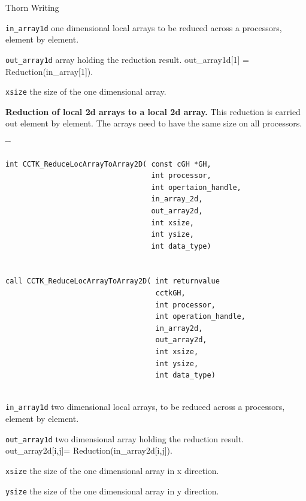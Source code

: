 \begin{cactuspart}{Thorn Writing}
\begin{Lentry}
\item[\texttt{in\_array1d}] one dimensional local arrays to be reduced across a 
processors, element by element. 
\item[\texttt{out\_array1d}] array holding the reduction result. out\_array1d[1]
= Reduction(in\_array[1]).
\item[\texttt{xsize}] the size of the one dimensional array.
\end{Lentry}

\vskip 0.25cm

{\bf Reduction of local 2d arrays to a local 2d array.} This reduction is carried
out element by element. The arrays need to have the same size on all
processors.
{\t
\begin{verbatim}
int CCTK_ReduceLocArrayToArray2D( const cGH *GH,
                                  int processor,
                                  int opertaion_handle,
                                  in_array_2d,
                                  out_array2d,
                                  int xsize,
                                  int ysize,
                                  int data_type)
                                 

call CCTK_ReduceLocArrayToArray2D( int returnvalue
                                   cctkGH,
                                   int processor,
                                   int operation_handle,
                                   in_array2d,
                                   out_array2d,
                                   int xsize,
                                   int ysize,
                                   int data_type)
                                 
\end{verbatim}
}

\begin{Lentry}
\item[\texttt{in\_array1d}] two dimensional local arrays, to be reduced across a 
processors, element by element. 
\item[\texttt{out\_array1d}] two dimensional array holding the reduction
result. out\_array2d[i,j]= Reduction(in\_array2d[i,j]).
\item[\texttt{xsize}] the size of the one dimensional array in x direction.
\item[\texttt{ysize}] the size of the one dimensional array in y direction.
\end{Lentry}


\end{cactuspart}
